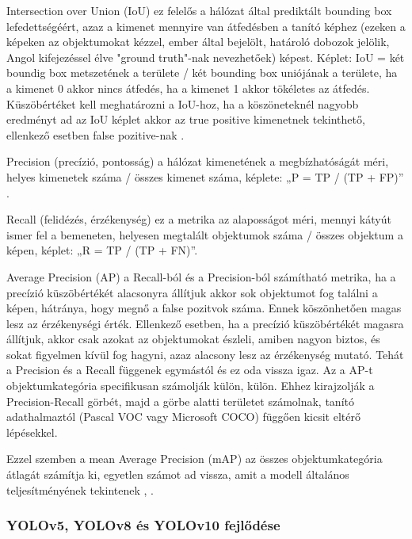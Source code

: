 Intersection over Union (IoU) ez felelős a hálózat által prediktált
bounding box lefedettségéért, azaz a kimenet mennyire van átfedésben a
tanító képhez (ezeken a képeken az objektumokat kézzel, ember által
bejelölt, határoló dobozok jelölik, Angol kifejezéssel élve "ground
truth"-nak nevezhetőek) képest. Képlet: IoU = két boundig box
metszetének a területe / két bounding box uniójának a területe, ha a
kimenet 0 akkor nincs átfedés, ha a kimenet 1 akkor tökéletes az
átfedés. Küszöbértéket kell meghatározni a IoU-hoz, ha a köszöneteknél
nagyobb eredményt ad az IoU képlet akkor az true positive kimenetnek
tekinthető, ellenkező esetben false pozitive-nak \cite{tervenComprehensiveReviewYOLO2023}.

Precision (precízió, pontosság) a hálózat kimenetének a megbízhatóságát
méri, helyes kimenetek száma / összes kimenet száma, képlete: „P = TP /
(TP + FP)'' \cite{vinothLightweightObjectDetection2024}.

Recall (felidézés, érzékenység) ez a metrika az alaposságot méri, mennyi
kátyút ismer fel a bemeneten, helyesen megtalált objektumok száma /
összes objektum a képen, képlet: „R = TP / (TP + FN)''\cite{vinothLightweightObjectDetection2024}.

Average Precision (AP) a Recall-ból és a Precision-ból számítható
metrika, ha a precízió küszöbértékét alacsonyra állítjuk akkor sok
objektumot fog találni a képen, hátránya, hogy megnő a false pozitvok
száma. Ennek köszönhetően magas lesz az érzékenységi érték. Ellenkező
esetben, ha a precízió küszöbértékét magasra állítjuk, akkor csak azokat
az objektumokat észleli, amiben nagyon biztos, és sokat figyelmen kívül
fog hagyni, azaz alacsony lesz az érzékenység mutató. Tehát a Precision
és a Recall függenek egymástól és ez oda vissza igaz. Az a AP-t
objektumkategória specifikusan számolják külön, külön. Ehhez kirajzolják
a Precision-Recall görbét, majd a görbe alatti területet számolnak,
tanító adathalmaztól (Pascal VOC vagy Microsoft COCO) függően kicsit
eltérő lépésekkel.

Ezzel szemben a mean Average Precision (mAP) az összes objektumkategória
átlagát számítja ki, egyetlen számot ad vissza, amit a modell általános
teljesítményének tekintenek \cite{tervenComprehensiveReviewYOLO2023}, \cite{liuDeepLearningGeneric2019}.

\subsubsection{YOLOv5, YOLOv8 és YOLOv10
	fejlődése}

